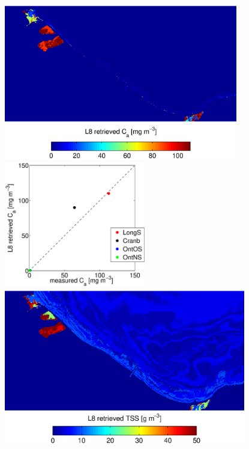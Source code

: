 \documentclass[onecolumn,3p,letterpaper]{elsarticle}
\begin{document}
\begin{figure}[htbp!]
  \begin{minipage}[c]{0.55\linewidth}
  		\centering
      \includegraphics[trim=0 20 0 30,clip,height=6.8cm]{./Images/CHLmap130919_150420}  
  \end{minipage}
  \hfill
  \begin{minipage}[d]{0.35\linewidth}
      \includegraphics[trim=40 0 0 20,clip,height=5.5cm]{./Images/CHLretvsmea130919_150420}
  \end{minipage}
% 
  \begin{minipage}[c]{0.55\linewidth}
  		\centering
      \includegraphics[trim=0 30 0 10,clip,height=6.8cm]{./Images/TSSmap130919_150420}  
  \end{minipage}

\end{figure}
\end{document}

